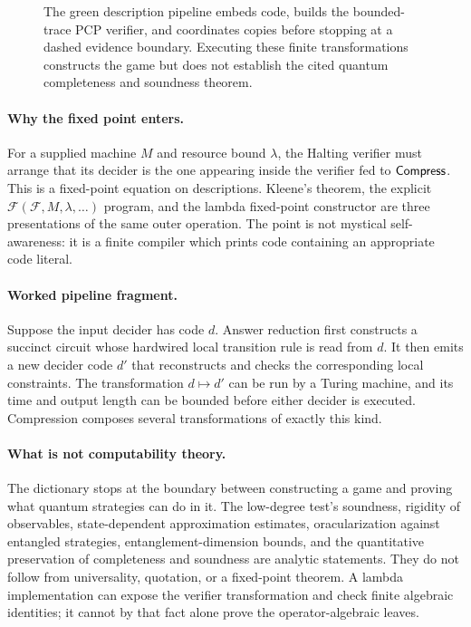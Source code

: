 \begin{figure}[ht]
\centering

\caption{The green description pipeline embeds code, builds the bounded-trace PCP verifier, and coordinates copies before stopping at a dashed evidence boundary.  Executing these finite transformations constructs the game but does not establish the cited quantum completeness and soundness theorem.}
\label{fig:pipeline-stages}
\end{figure}

\paragraph{Why the fixed point enters.}
For a supplied machine \(M\) and resource bound \(\lambda\), the Halting verifier
must arrange that its decider is the one appearing inside the verifier fed to
\(\mathsf{Compress}\).  This is a fixed-point equation on descriptions.  Kleene's
theorem, the explicit \(\mathcal F(\mathcal F,M,\lambda,\ldots)\) program, and the
lambda fixed-point constructor are three presentations of the same outer
operation.  The point is not mystical self-awareness: it is a finite compiler
which prints code containing an appropriate code literal.

\paragraph{Worked pipeline fragment.}
Suppose the input decider has code \(d\).  Answer reduction first constructs a
succinct circuit whose hardwired local transition rule is read from \(d\).
It then emits a new decider code \(d'\) that reconstructs and checks the
corresponding local constraints.  The transformation \(d\mapsto d'\) can be
run by a Turing machine, and its time and output length can be bounded before
either decider is executed.  Compression composes several transformations of
exactly this kind.

\paragraph{What is not computability theory.}
The dictionary stops at the boundary between constructing a game and proving
what quantum strategies can do in it.  The low-degree test's soundness,
rigidity of observables, state-dependent approximation estimates,
oracularization against entangled strategies, entanglement-dimension bounds,
and the quantitative preservation of completeness and soundness are analytic
statements.  They do not follow from universality, quotation, or a fixed-point
theorem.  A lambda implementation can expose the verifier transformation and
check finite algebraic identities; it cannot by that fact alone prove the
operator-algebraic leaves.

